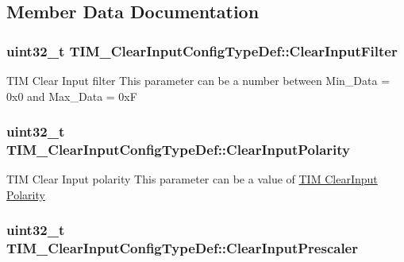 \subsection{Member Data Documentation}
\hypertarget{struct_t_i_m___clear_input_config_type_def_a6d2e06a970e30aaf4f8a6091e443eecf}{
\subsubsection[{Clear\-Input\-Filter}]{\setlength{\rightskip}{0pt plus 5cm}uint32\-\_\-t T\-I\-M\-\_\-\-Clear\-Input\-Config\-Type\-Def\-::\-Clear\-Input\-Filter}}\label{struct_t_i_m___clear_input_config_type_def_a6d2e06a970e30aaf4f8a6091e443eecf}
T\-I\-M Clear Input filter This parameter can be a number between Min\-\_\-\-Data = 0x0 and Max\-\_\-\-Data = 0x\-F \hypertarget{struct_t_i_m___clear_input_config_type_def_a49dbc65edc5316822fcabd61cc8409de}{
\subsubsection[{Clear\-Input\-Polarity}]{\setlength{\rightskip}{0pt plus 5cm}uint32\-\_\-t T\-I\-M\-\_\-\-Clear\-Input\-Config\-Type\-Def\-::\-Clear\-Input\-Polarity}}\label{struct_t_i_m___clear_input_config_type_def_a49dbc65edc5316822fcabd61cc8409de}
T\-I\-M Clear Input polarity This parameter can be a value of \hyperlink{group___t_i_m___clear_input___polarity}{T\-I\-M Clear\-Input Polarity} \hypertarget{struct_t_i_m___clear_input_config_type_def_a509cecb64fec71391ddc8b4703e09cfe}{
\subsubsection[{Clear\-Input\-Prescaler}]{\setlength{\rightskip}{0pt plus 5cm}uint32\-\_\-t T\-I\-M\-\_\-\-Clear\-Input\-Config\-Type\-Def\-::\-Clear\-Input\-Prescaler}}\label{struct_t_i_m___clear_input_config_type_def_a509cecb64fec71391ddc8b4703e09cfe}
